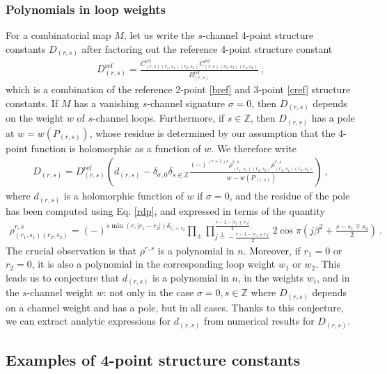 \documentclass[12pt, a4paper]{article}
\theoremstyle{break}
\begin{document}
\subsubsection{Polynomials in loop weights} 

For a combinatorial map $M$, let us write the $s$-channel 4-point structure constants $D_{(r,s)}$ after factoring out the reference 4-point structure constant 
\begin{align}
 D_{(r,s)}^\text{ref} = \frac{C^\text{ref}_{(r,s)(r_1,s_1)(r_2,s_2)} C^\text{ref}_{(r,s)(r_3,s_3)(r_4,s_4)}}{B^\text{ref}_{(r,s)}}\ , 
\end{align}
which is a combination of the reference 2-point \eqref{bref} and 3-point \eqref{cref} structure constants. If $M$ has a vanishing $s$-channel signature $\sigma=0$, then $D_{(r,s)}$ depends on the weight $w$ of $s$-channel loops. Furthermore, if $s\in\mathbb{Z}$, then $D_{(r,s)}$ has a pole at $w=w(P_{(r,s)})$, whose residue is determined by our assumption that the 4-point function is holomorphic as a function of $w$. We therefore write 
\begin{align}
 D_{(r,s)} =  D_{(r,s)}^\text{ref} \left(d_{(r,s)}  - \delta_{\sigma,0}\delta_{s\in\mathbb{Z}}\frac{(-)^{(r+1)s}\rho^{r,s}_{(r_1,s_1)(r_2,s_2)}\rho^{r,s}_{(r_4,s_4)(r_3,s_3)}}{w-w(P_{(r,s)})}\right) \ ,
\end{align}
where $d_{(r,s)}$ is a holomorphic function of $w$ if $\sigma=0$, and the residue of the pole has been computed using Eq. \eqref{rdp}, and expressed in terms of the quantity
\begin{align}
\rho^{r,s}_{(r_1,s_1)(r_2,s_2)}= (-)^{s\min(r,|r_1-r_2|)\delta_{r_1<r_2}} \prod_\pm \prod_{j\overset{1}{=}-\frac{r-1-|r_1\pm r_2|}{2}}^{\frac{r-1-|r_1\pm r_2|}{2}} 2\cos\pi\left(j\beta^2+\tfrac{s-s_1\mp s_2}{2}\right)\ . 
 \label{rhop}
\end{align}
The crucial observation is that $\rho^{r,s}$ is a polynomial in $n$. Moreover, if $r_1=0$ or $r_2=0$, it is also a polynomial in the corresponding loop weight $w_1$ or $w_2$. This leads us to conjecture that $d_{(r,s)}$ is a polynomial in $n$, in the weights $w_i$, and in the $s$-channel weight $w$: not only in the case $\sigma=0, s\in\mathbb{Z}$ where $D_{(r,s)}$ depends on a channel weight and has a pole, but in all cases. 
Thanks to this conjecture, we can extract analytic expressions for $d_{(r,s)}$ from numerical results for $D_{(r,s)}$. 


\subsection{Examples of 4-point structure constants}
\end{document}
